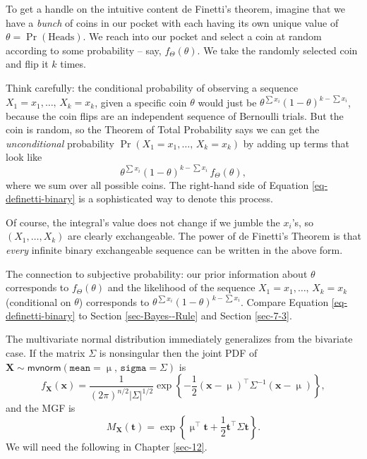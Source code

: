 \documentclass[captions=tableheading]{scrbook}
\begin{document}
To get a handle on the intuitive content de Finetti's theorem, imagine that we have a \emph{bunch} of coins in our pocket with each having its own unique value of \(\theta=\Pr(\mbox{Heads})\). We reach into our pocket and select a coin at random according to some probability -- say, \(f_{\Theta}(\theta)\). We take the randomly selected coin and flip it \(k\) times. 

Think carefully: the conditional probability of observing a sequence  \(X_{1}=x_{1},\ldots,\, X_{k}=x_{k}\), given a specific coin \(\theta\) would just be \(\theta^{\sum x_{i}}(1-\theta)^{k-\sum x_{i}}\), because the coin flips are an independent sequence of Bernoulli trials. But the coin is random, so the Theorem of Total Probability says we can get the \emph{unconditional} probability \(\Pr(X_{1}=x_{1},\ldots,\, X_{k}=x_{k})\) by adding up terms that look like
\begin{equation}
\theta^{\sum x_{i}}(1-\theta)^{k-\sum x_{i}}\, f_{\Theta}(\theta),
\end{equation}
where we sum over all possible coins. The right-hand side of Equation \ref{eq-definetti-binary} is a sophisticated way to denote this process.

Of course, the integral's value does not change if we jumble the \(x_{i}\)'s, so \((X_{1},\ldots,X_{k})\) are clearly exchangeable. The power of de Finetti's Theorem is that \emph{every} infinite binary exchangeable sequence can be written in the above form.

The connection to subjective probability: our prior information about \(\theta\) corresponds to \(f_{\Theta}(\theta)\) and the likelihood of the sequence \(X_{1}=x_{1},\ldots,\, X_{k}=x_{k}\) (conditional on \(\theta\)) corresponds to \(\theta^{\sum x_{i}}(1-\theta)^{k-\sum x_{i}}\). Compare Equation \ref{eq-definetti-binary} to Section \ref{sec-Bayes--Rule} and Section \ref{sec-7-3}.

The multivariate normal distribution immediately generalizes from the bivariate case. If the matrix \(\Sigma\) is nonsingular then the joint PDF of \(\mathbf{X}\sim\mathsf{mvnorm}(\mathtt{mean}=\upmu,\,\mathtt{sigma}=\Sigma)\) is
\begin{equation}
f_{\mathbf{X}}(\mathbf{x})=\frac{1}{(2\pi)^{n/2}\left|\Sigma\right|^{1/2}}\exp\left\{ -\frac{1}{2}\left(\mathbf{x}-\upmu\right)^{\top}\Sigma^{-1}\left(\mathbf{x}-\upmu\right)\right\},
\end{equation}
and the MGF is
\begin{equation}
M_{\mathbf{X}}(\mathbf{t})=\exp\left\{ \upmu^{\top}\mathbf{t}+\frac{1}{2}\mathbf{t}^{\top}\Sigma\mathbf{t}\right\}.
\end{equation}
We will need the following in Chapter \ref{sec-12}.
\end{document}

